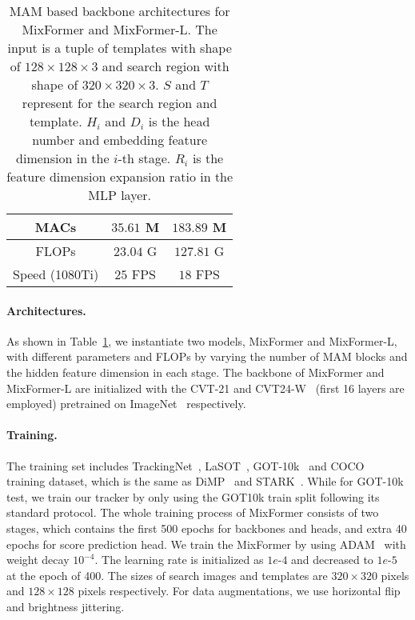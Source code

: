 \begin{table}[pt]
{{\begin{tabular}{c|c|l|c|c}
\multicolumn{3}{c|}{MACs}  
& $35.61$ M
& $183.89$ M
\\ \hline
\multicolumn{3}{c|}{FLOPs}  
& $23.04$ G
& $127.81$ G
\\ \hline
\multicolumn{3}{c|}{Speed (1080Ti)}  
& $25$ FPS 
& $18$ FPS 
\\ \hline
\end{tabular}
}}
\vspace{-2mm}
\caption{MAM based backbone architectures for MixFormer and MixFormer-L. The input is a tuple of templates with shape of $128\times128\times3$ and search region with shape of $320\times320\times3$. $S$ and $T$ represent for the search region and template. $H_i$ and $D_i$ is the head number and embedding feature dimension in the $i$-th stage. $R_i$ is the feature dimension expansion ratio in the MLP layer. 
}
\label{tab:arch}
\vspace{-4mm}
\end{table}

\paragraph{Architectures.}\label{model_arch}
As shown in Table~\ref{tab:arch}, we instantiate two models, MixFormer and MixFormer-L, with different parameters and FLOPs by varying the number of MAM blocks and the hidden feature dimension in each stage. The backbone of MixFormer and MixFormer-L are initialized with the CVT-21 and CVT24-W~\cite{cvt} (first 16 layers are employed) pretrained on ImageNet~\cite{imagenet} respectively.
\vspace{-4mm}
\paragraph{Training.} 
The training set includes TrackingNet~\cite{trackingnet}, LaSOT~\cite{lasot}, GOT-10k~\cite{got10k} and COCO~\cite{coco} training dataset, which is the same as DiMP~\cite{dimp} and STARK~\cite{stark}.
While for GOT-10k test, we train our tracker by only using the GOT10k train split following its standard protocol. 
The whole training process of MixFormer consists of two stages, which contains the first 500 epochs for backbones and heads, and extra 40 epochs for score prediction head. 
We train the MixFormer by using ADAM~\cite{adam} with weight decay $10^{-4}$. The learning rate is initialized as $1e$-$4$ and decreased to $1e$-$5$ at the epoch of 400. 
The sizes of search images and templates are $320\times320$
pixels and $128\times128$ pixels respectively. For data augmentations, we use horizontal flip and brightness jittering.
\vspace{-4mm}

